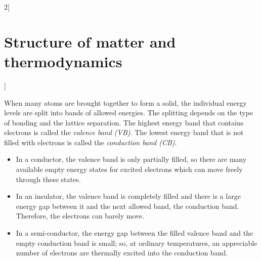 \documentclass[../../../main.tex]{subfiles}
\begin{document}
\begin{multicols}{2}[\section{Structure of matter and thermodynamics}]
\begin{definition}
\begin{center}
      \begin{minipage}{\linewidth}
        \centering
        
      \end{minipage}
    \end{center}
  \end{definition}
  \begin{prop}
    When many atoms are brought together to form a solid, the individual energy levels are split into bands of allowed energies. The splitting depends on the type of bonding and the lattice separation. The highest energy band that contains electrons is called the \textit{valence band (VB)}. The lowest energy band that is not filled with electrons is called the \textit{conduction band (CB)}.
    \begin{center}
      \begin{minipage}{\linewidth}
        \centering
        
      \end{minipage}
    \end{center}
    \begin{itemize}
      \item In a conductor, the valence band is only partially filled, so there are many available empty energy states for excited electrons which can move freely through these states.
      \item In an insulator, the valence band is completely filled and there is a large energy gap between it and the next allowed band, the conduction band. Therefore, the electrons can barely move.
      \item In a semi-conductor, the energy gap between the filled valence band and the empty conduction band is small; so, at ordinary temperatures, an appreciable number of electrons are thermally excited into the conduction band.
    \end{itemize}
  \end{prop}
\end{multicols}
\begin{center}
  \begin{minipage}{\linewidth}
    \centering
    
  \end{minipage}
\end{center}
\end{document}
